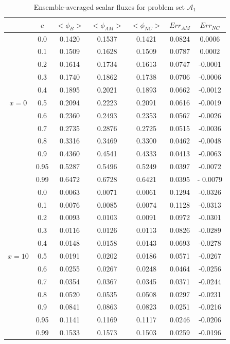 \documentclass[12pt]{article}
\newcommand{\bl}{\big<}
\newcommand{\bg}{\big>}
\newcommand{\seta}{\mathcal{A}}
\begin{document}
{\begin{table}[p]
\centering
\caption{Ensemble-averaged scalar fluxes for problem set $\seta_1$}
\label{tab2} 
\begin{tabular}{||c|c||c|c|c||c|c||} \hline \hline
  & $c$ & $\bl\phi_B\bg$ & $\bl\phi_{AM}\bg$ &$\bl\phi_{NC}\bg$ & $Err_{AM}$ & $ Err_{NC}$\\ \hline\hline
& 0.0 & 0.1420 & 0.1537 & 0.1421 & 0.0824 & 0.0006 \\
\cline{2-7}
& 0.1 & 0.1509 & 0.1628 & 0.1509 & 0.0787 & 0.0002 \\
\cline{2-7}
& 0.2 & 0.1614 & 0.1734 & 0.1613 & 0.0747 & -0.0001 \\
\cline{2-7}
& 0.3 & 0.1740 & 0.1862 & 0.1738 & 0.0706 & -0.0006 \\
\cline{2-7}
& 0.4 & 0.1895 & 0.2021 & 0.1893 & 0.0662 & -0.0012 \\
\cline{2-7}
$x=0$ & 0.5 & 0.2094 & 0.2223 & 0.2091 & 0.0616 &  -0.0019 \\
\cline{2-7}
& 0.6 & 0.2360 & 0.2493 & 0.2353 & 0.0567 & -0.0026 \\
\cline{2-7}
& 0.7 & 0.2735 & 0.2876 & 0.2725 & 0.0515 & -0.0036 \\
\cline{2-7}
& 0.8 & 0.3316 & 0.3469 & 0.3300 & 0.0462 & -0.0048 \\
\cline{2-7}
& 0.9 & 0.4360 & 0.4541 & 0.4333 & 0.0413 & -0.0063 \\
\cline{2-7}
& 0.95 & 0.5287 & 0.5496 & 0.5249 & 0.0397 & -0.0072 \\
\cline{2-7}
& 0.99 & 0.6472 & 0.6728 & 0.6421 & 0.0395 & - 0.0079  \\
\hline\hline
& 0.0 & 0.0063 & 0.0071 & 0.0061 & 0.1294 & -0.0326 \\
\cline{2-7}
& 0.1 & 0.0076 & 0.0085 & 0.0074 & 0.1128 & -0.0313 \\
\cline{2-7}
& 0.2 & 0.0093 & 0.0103 & 0.0091 & 0.0972 & -0.0301 \\
\cline{2-7}
& 0.3 & 0.0116 & 0.0126 & 0.0113 & 0.0826& -0.0289 \\
\cline{2-7}
& 0.4 & 0.0148 & 0.0158 & 0.0143 & 0.0693 & -0.0278 \\
\cline{2-7}
$x=10$ & 0.5 & 0.0191 & 0.0202 & 0.0186 & 0.0571 & -0.0267 \\
\cline{2-7}
& 0.6 & 0.0255 & 0.0267 & 0.0248 & 0.0464 & -0.0256 \\
\cline{2-7}
& 0.7 & 0.0354 & 0.0367 & 0.0345 & 0.0371 & -0.0244 \\
\cline{2-7}
& 0.8 & 0.0520 & 0.0535 & 0.0508 & 0.0297 & -0.0231 \\
\cline{2-7}
& 0.9 & 0.0841 & 0.0863 & 0.0823 & 0.0251 & -0.0216 \\
\cline{2-7}
& 0.95 & 0.1141 & 0.1169 & 0.1117 & 0.0246 & -0.0206 \\
\cline{2-7}
& 0.99 & 0.1533 & 0.1573 & 0.1503 & 0.0259 & -0.0196 \\
\hline\hline
  \end{tabular}
\end{table}





}
\end{document}

